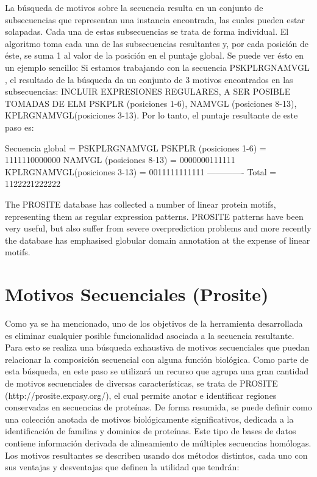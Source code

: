 La búsqueda de motivos sobre la secuencia resulta en un conjunto de subsecuencias que representan una instancia encontrada, las cuales pueden estar solapadas. Cada una de estas subsecuencias se trata de forma individual.
El algoritmo toma cada una de las subsecuencias resultantes y, por cada posición de éste, se suma 1 al valor de la posición en el puntaje global.
Se puede ver ésto en un ejemplo sencillo:
Si estamos trabajando con la secuencia PSKPLRGNAMVGL , el resultado de la búsqueda da un conjunto de 3 motivos encontrados en las subsecuencias: INCLUIR EXPRESIONES REGULARES, A SER POSIBLE TOMADAS DE ELM
PSKPLR (posiciones 1-6), NAMVGL (posiciones 8-13), KPLRGNAMVGL(posiciones 3-13).
Por lo tanto, el puntaje resultante de este paso es:

Secuencia global             =   PSKPLRGNAMVGL
PSKPLR (posiciones 1-6)      =   1111110000000 
NAMVGL (posiciones 8-13)     =   0000000111111  
KPLRGNAMVGL(posiciones 3-13) =   0011111111111
 -------------
Total                        =   1122221222222


The PROSITE database has collected a number of linear protein motifs, representing them as regular expression patterns. 
PROSITE patterns have been very useful, but also suffer from severe overprediction problems and more recently the database has emphasised globular domain annotation at the expense of linear motifs.


\section{Motivos Secuenciales (Prosite)}

Como ya se ha mencionado, uno de los objetivos de la herramienta desarrollada es eliminar cualquier posible funcionalidad asociada a la secuencia resultante. Para esto se realiza una búsqueda exhaustiva de motivos secuenciales que puedan relacionar la composición secuencial con alguna función biológica.
Como parte de esta búsqueda, en este paso se utilizará un recurso que agrupa una gran cantidad de motivos secuenciales de diversas características, se trata de PROSITE (http://prosite.expasy.org/), el cual permite anotar e identificar regiones conservadas en secuencias de proteínas.
De forma resumida, se puede definir como una colección anotada de motivos biológicamente significativos, dedicada a la identificación de familias y dominios de proteínas.
Este tipo de bases de datos contiene información derivada de alineamiento de múltiples secuencias homólogas. Los motivos resultantes se describen usando dos métodos distintos, cada uno con sus ventajas y desventajas que definen la utilidad que tendrán:

